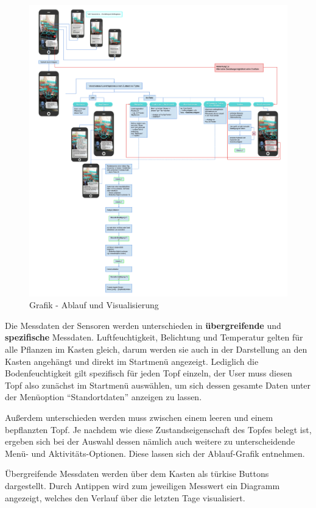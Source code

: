 \begin{figure}
\centering
\includegraphics{img/AblaufVisualisierung_kompr.jpg}
\caption{Grafik - Ablauf und Visualisierung}
\end{figure}

Die Messdaten der Sensoren werden unterschieden in
\textbf{übergreifende} und \textbf{spezifische} Messdaten.
Luftfeuchtigkeit, Belichtung und Temperatur gelten für alle Pflanzen im
Kasten gleich, darum werden sie auch in der Darstellung an den Kasten
angehängt und direkt im Startmenü angezeigt. Lediglich die
Bodenfeuchtigkeit gilt spezifisch für jeden Topf einzeln, der User muss
diesen Topf also zunächst im Startmenü auswählen, um sich dessen gesamte
Daten unter der Menüoption ``Standortdaten'' anzeigen zu lassen.

Außerdem unterschieden werden muss zwischen einem leeren und einem
bepflanzten Topf. Je nachdem wie diese Zustandseigenschaft des Topfes
belegt ist, ergeben sich bei der Auswahl dessen nämlich auch weitere zu
unterscheidende Menü- und Aktivitäts-Optionen. Diese lassen sich der
Ablauf-Grafik entnehmen.

Übergreifende Messdaten werden über dem Kasten als türkise Buttons
dargestellt. Durch Antippen wird zum jeweiligen Messwert ein Diagramm
angezeigt, welches den Verlauf über die letzten Tage visualisiert.

